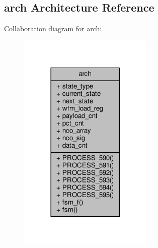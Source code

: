 \subsection{arch Architecture Reference}
\label{classwfm__pct__gen_1_1arch}


Collaboration diagram for arch\+:\nopagebreak
\begin{figure}[H]
\begin{center}
\leavevmode
\includegraphics[width=182pt]{de/dcd/classwfm__pct__gen_1_1arch__coll__graph}
\end{center}
\end{figure}
